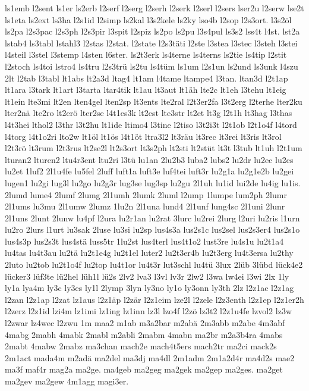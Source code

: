 {ls1emb
l2sent
ls1er
ls2erb
l2serf
l2serg
l2serh
l2serk
l2serl
l2sers
lser2u
l2serw
lse2t
ls1eta
ls2ext
ls3ha
l2s1id
l2simp
ls2kal
l3s2kele
ls2ky
lso4b
l2sop
l2s3ort.
l3s2öl
ls2pa
l2s3pac
l2s3ph
l2s3pir
l3spit
l2spiz
ls2po
ls2pu
l3s4pul
ls3s2
lss4t
l4st.
lst2a
lstab4
ls3tabl
lstahl3
l2stas
l2stat.
l2state
l2s3täti
l2ste
l3stea
l3stec
l3steh
l3stei
l4steil
l3stel
l3stemp
l4sten
l6ster.
ls2t3erk
ls4terne
ls4terns
ls2tie
ls4tip
l2stit
l2stoch
ls4toi
lstro4
ls4tru
l2s3trü
ls2tu
ls4tüm
ls1um
l2s1un
ls2und
ls3unk
l4szu
2lt
l2tab
l3tabl
lt1abs
lt2a3d
ltag4
lt1am
l4tame
ltampe4
l3tan.
ltan3d
l2t1ap
lt1ara
l3tark
lt1art
l3tarta
ltar4tik
lt1au
lt3aut
lt1äh
lte2c
lt1eh
l3tehu
lt1eig
lt1ein
lte3mi
lt2en
lten4gel
lten2sp
lt3ents
lte2ral
l2t3er2fa
l3t2erg
l2terhe
lter2ku
lter2nä
lte2ro
lt2erö
lter2se
l4t1es3k
lt2est
lte3str
lt2et
lt3g
l2t1h
lt3hag
l3thas
l4t3hei
lthol2
l3thr
l3t2hu
lt1ide
ltimo4
l3tine
l2tiso
l3t2i3t
l2t1ob
l2t1o4f
l4tord
l4torg
l4t1o2ri
lto2w
lt1öl
lt1ös
l4t1öt
ltra3l2
lt3räu
lt3rec
lt3rei
lt3ris
lt3rol
l2t3rö
lt3rum
l2t3rus
lt2se2l
lt2s3ort
lt3s2ph
lt2sti
lt2stüt
lt3t
l3tub
lt1uh
l2t1um
lturan2
lturen2
ltu4r3ent
ltu2ri
l3tü
lu1an
2lu2b3
luba2
lubs2
lu2dr
lu2ec
lu2es
lu2et
1luf2
2l1u4fe
lu5fel
2luff
luft1a
luft3e
luf4tei
luft3r
lu2g1a
lu2g1e2b
lu2gei
lugen1
lu2gi
lug3l
lu2go
lu2g3r
lug3se
lug3sp
lu2gu
2l1uh
lu1id
lui2de
lu4ig
lu1is.
2lumd
lume4
2lumf
2lumg
2l1umh
2lumk
2luml
l2ump
1lumpe
lum2ph
2lumr
2l1ums
lu3mu
2l1umw
2lumz
1lu2n
2l1una
lund4
2l1unf
lung4sc
2l1uni
2lunr
2l1uns
2lunt
2lunw
lu4pf
l2ura
lu2r1an
lu2rat
3lurc
lu2rei
2lurg
l2uri
lu2ris
l1urn
lu2ro
2lurs
l1urt
lu3sak
2luse
lu3si
lu2sp
lus4s3a
lus2s1c
lus2sel
lus2s3er4
lus2s1o
lus4s3p
lus2s3t
lus4stä
luss5tr
1lu2st
lus4terl
lus4t1o2
lust3re
lu4s1u
lu2t1a4
lu4tas
lu4t3au
lu2tä
lu2t1e4g
lu2t1el
luter2
lu2t3er4b
lu2t3erg
lu4t3ersa
lu2thy
2luto
lu2tob
lu2t1o4f
lu2top
lu4t1or
lu4t3r
lut3schl
lu4tü
3lux
2lüb
3lübd
lück4e2
lücker3
lüf3te
lü2hel
lüh1l
lü2s
2lv2
lva3
l3vl
lv3r
2lw2
l3wa
lw4ei
l3wi
2lx
1ly
ly1a
lya4m
ly3c
ly3es
ly1l
2lymp
3lyn
ly3no
ly1o
ly3onn
ly3th
2lz
l2z1ac
l2z1ag
l2zan
l2z1ap
l2zat
lz1aus
l2z1äp
l2zär
l2z1eim
lze2l
l2zele
l2z3enth
l2z1ep
l2z1er2h
l2zerz
l2z1id
lzi4m
lz1imi
lz1ing
lz1inn
lz3l
lzo4f
l2zö
lz3t2
l2z1u4fe
lzvol2
lz3w
l2zwar
lz4wec
l2zwu
1m
maa2
m1ab
m3a2bar
m2abä
2m3abb
m2abe
4m3abf
4mabg
2mabh
4mabk
2mabl
m2abli
2mabm
4mabn
ma2br
m2a3b4ra
4mabs
2mabt
4mabw
2mabz
ma3chan
mach2e
mach4t5ers
mach2tr
ma2ci
mack2s
2m1act
mada4m
m2adä
ma2del
ma3dj
ma4dl
2m1adm
2m1a2d4r
ma4d2s
mae2
ma3f
maf4r
mag2a
ma2ge.
ma4geb
ma2geg
ma2gek
ma2gep
ma2ges.
ma2get
ma2gev
ma2gew
4m1agg
magi3er.
}

